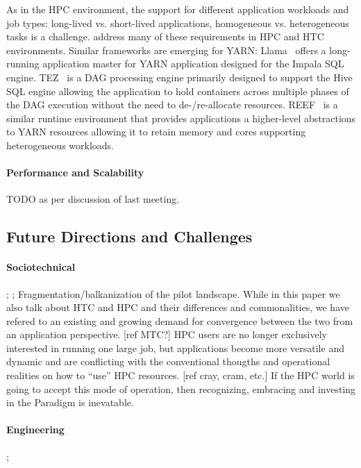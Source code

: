 \documentclass{sig-alternate}
\begin{document}
As in the HPC environment, the support for different application
workloads and job types: long-lived vs. short-lived applications,
homogeneous vs. heterogeneous tasks is a challenge. \pilots address many
of these requirements in HPC and HTC environments. Similar frameworks
are emerging for YARN: Llama~\cite{llama} offers a long-running
application master for YARN application designed for the Impala SQL
engine. TEZ~\cite{tez} is a DAG processing engine primarily designed to
support the Hive SQL engine allowing the application to hold containers
across multiple phases of the DAG execution without the need to
de-/re-allocate resources. REEF~\cite{Chun:2013:RRE:2536274.2536318} is
a similar runtime environment that provides applications a higher-level
abstractions to YARN resources allowing it to retain memory and cores
supporting heterogeneous workloads.

\paragraph*{Performance and Scalability} TODO as per discussion of last
meeting.

%
\subsection{Future Directions and Challenges}
\label{sec:5.3}

\paragraph*{Sociotechnical} ;
; Fragmentation/balkanization of
the pilot landscape.
While in this paper we also talk about HTC and HPC and their differences and
commonalities, we have refered to an existing and growing demand for
convergence between the two from an application perspective.
[ref MTC?]
HPC users are no longer exclusively interested in running one large job, but
applications become more versatile and dynamic and are conflicting with the
conventional thougths and operational realities on how to ``use'' HPC
resources. [ref cray, cram, etc.]
If the HPC world is going to accept this mode of operation, then recognizing,
embracing and investing in the \pilot Paradigm is inevatable.

\paragraph*{Engineering} ; 
\end{document}
